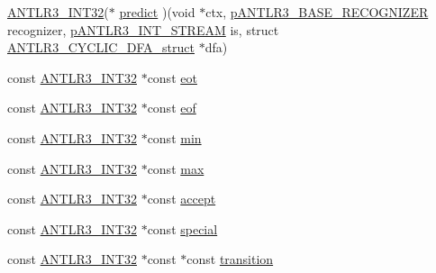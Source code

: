 \begin{DoxyCompactItemize}
\item 
\hyperlink{antlr3defs_8h_a6faef5c4687f8eb633d2aefea93973ca}{A\-N\-T\-L\-R3\-\_\-\-I\-N\-T32}($\ast$ \hyperlink{struct_a_n_t_l_r3___c_y_c_l_i_c___d_f_a__struct_a60d5596e45bd13aec491f2a789832305}{predict} )(void $\ast$ctx, \hyperlink{group___a_n_t_l_r3___b_a_s_e___r_e_c_o_g_n_i_z_e_r_ga5aeeb8dcbf65f45605ae07cbd618e24c}{p\-A\-N\-T\-L\-R3\-\_\-\-B\-A\-S\-E\-\_\-\-R\-E\-C\-O\-G\-N\-I\-Z\-E\-R} recognizer, \hyperlink{antlr3interfaces_8h_af34d949f6aa442e8e7770e420977d338}{p\-A\-N\-T\-L\-R3\-\_\-\-I\-N\-T\-\_\-\-S\-T\-R\-E\-A\-M} is, struct \hyperlink{struct_a_n_t_l_r3___c_y_c_l_i_c___d_f_a__struct}{A\-N\-T\-L\-R3\-\_\-\-C\-Y\-C\-L\-I\-C\-\_\-\-D\-F\-A\-\_\-struct} $\ast$dfa)
\item 
const \hyperlink{antlr3defs_8h_a6faef5c4687f8eb633d2aefea93973ca}{A\-N\-T\-L\-R3\-\_\-\-I\-N\-T32} $\ast$const \hyperlink{struct_a_n_t_l_r3___c_y_c_l_i_c___d_f_a__struct_aa483fc633ac657a66852b61926402f36}{eot}
\item 
const \hyperlink{antlr3defs_8h_a6faef5c4687f8eb633d2aefea93973ca}{A\-N\-T\-L\-R3\-\_\-\-I\-N\-T32} $\ast$const \hyperlink{struct_a_n_t_l_r3___c_y_c_l_i_c___d_f_a__struct_af87118c3402a6cf8d33be8673f7174e5}{eof}
\item 
const \hyperlink{antlr3defs_8h_a6faef5c4687f8eb633d2aefea93973ca}{A\-N\-T\-L\-R3\-\_\-\-I\-N\-T32} $\ast$const \hyperlink{struct_a_n_t_l_r3___c_y_c_l_i_c___d_f_a__struct_ad4f7b98244ffc38a190b39f84d25915e}{min}
\item 
const \hyperlink{antlr3defs_8h_a6faef5c4687f8eb633d2aefea93973ca}{A\-N\-T\-L\-R3\-\_\-\-I\-N\-T32} $\ast$const \hyperlink{struct_a_n_t_l_r3___c_y_c_l_i_c___d_f_a__struct_a74ba5647cc06f823e28ab0eda1bb7c0d}{max}
\item 
const \hyperlink{antlr3defs_8h_a6faef5c4687f8eb633d2aefea93973ca}{A\-N\-T\-L\-R3\-\_\-\-I\-N\-T32} $\ast$const \hyperlink{struct_a_n_t_l_r3___c_y_c_l_i_c___d_f_a__struct_aafb1916b8b74b9822e740b3ee1447db2}{accept}
\item 
const \hyperlink{antlr3defs_8h_a6faef5c4687f8eb633d2aefea93973ca}{A\-N\-T\-L\-R3\-\_\-\-I\-N\-T32} $\ast$const \hyperlink{struct_a_n_t_l_r3___c_y_c_l_i_c___d_f_a__struct_a48569ed0751db6efb88bb4cc8f9834fe}{special}
\item 
const \hyperlink{antlr3defs_8h_a6faef5c4687f8eb633d2aefea93973ca}{A\-N\-T\-L\-R3\-\_\-\-I\-N\-T32} $\ast$const $\ast$const \hyperlink{struct_a_n_t_l_r3___c_y_c_l_i_c___d_f_a__struct_a3a21fd1331a5610e606624920974b3ae}{transition}
\end{DoxyCompactItemize}


